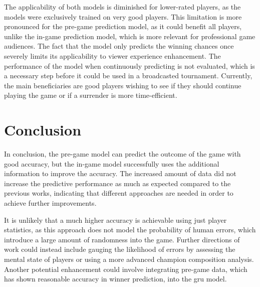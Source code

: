 \documentclass[12pt, a4paper, headinclude, twoside, plainheadsepline, open=right, numbers=noenddot, hidelinks, toc=listof, toc=bibliography]{scrreprt}
\begin{document}
The applicability of both models is diminished for lower-rated players, as the models were exclusively trained on very good players.
This limitation is more pronounced for the pre-game prediction model, as it could benefit all players, unlike the in-game prediction model, which is more relevant for professional game audiences.
The fact that the model only predicts the winning chances once severely limits its applicability to viewer experience enhancement.
The performance of the model when continuously predicting is not evaluated, which is a necessary step before it could be used in a broadcasted tournament.
Currently, the main beneficiaries are good players wishing to see if they should continue playing the game or if a surrender is more time-efficient.

\chapter{Conclusion}
\label{chap:conclusion}
In conclusion, the pre-game model can predict the outcome of the game with good accuracy, but the in-game model successfully uses the additional information to improve the accuracy.
The increased amount of data did not increase the predictive performance as much as expected compared to the previous works, indicating that different approaches are needed in order to achieve further improvements.

It is unlikely that a much higher accuracy is achievable using just player statistics, as this approach does not model the probability of human errors, which introduce a large amount of randomness into the game.
Further directions of work could instead include gauging the likelihood of errors by assessing the mental state of players or using a more advanced champion composition analysis.
Another potential enhancement could involve integrating pre-game data, which has shown reasonable accuracy in winner prediction, into the \ac{gru} model. 


%
%
%
\printbibliography

\appendix
\end{document}
